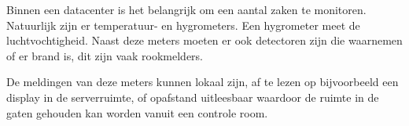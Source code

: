 Binnen een datacenter is het belangrijk om een aantal zaken te monitoren. Natuurlijk zijn er temperatuur- en hygrometers. Een hygrometer meet de luchtvochtigheid. Naast deze meters moeten er ook detectoren zijn die waarnemen of er brand is, dit zijn vaak rookmelders.

De meldingen van deze meters kunnen lokaal zijn, af te lezen op bijvoorbeeld een display in de serverruimte, of opafstand uitleesbaar waardoor de ruimte in de gaten gehouden kan worden vanuit een controle room.


